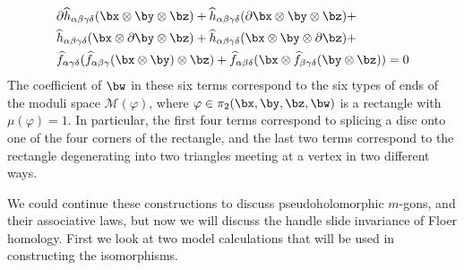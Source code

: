 \begin{align*}
&\partial \widehat{h}_{\alpha\beta\gamma\delta}(\bx\otimes\by\otimes\bz) + \widehat{h}_{\alpha\beta\gamma\delta}(\partial\bx\otimes\by\otimes\bz) + \\
&\widehat{h}_{\alpha\beta\gamma\delta}(\bx\otimes\partial\by\otimes\bz) + \widehat{h}_{\alpha\beta\gamma\delta}(\bx\otimes\by\otimes\partial\bz) + \\
&\widehat{f}_{\alpha\gamma\delta}(\widehat{f}_{\alpha\beta\gamma}(\bx\otimes\by) \otimes \bz) + \widehat{f}_{\alpha\beta\delta}(\bx \otimes \widehat{f}_{\beta\gamma\delta}(\by \otimes \bz)) = 0
\end{align*}
The coefficient of $\bw$ in these six terms correspond to the six types of ends of the moduli space $\mathcal M(\varphi)$, where $\varphi \in \pi_2(\bx,\by,\bz,\bw)$ is a rectangle with $\mu(\varphi)=1$. In particular, the first four terms correspond to splicing a disc onto one of the four corners of the rectangle, and the last two terms correspond to the rectangle degenerating into two triangles meeting at a vertex in two different ways. 

We could continue these constructions to discuss pseudoholomorphic $m$-gons, and their associative laws, but now we will discuss the handle slide invariance of Floer homology. First we look at two model calculations that will be used in constructing the isomorphisms.

